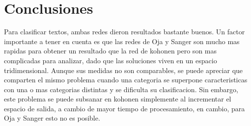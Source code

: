 \section{Conclusiones}
Para clasificar textos, ambas redes dieron resultados bastante buenos. Un factor importante a tener en cuenta es que las redes de Oja y Sanger son mucho mas rapidas para obtener un resultado que la red de kohonen pero son mas complicadas para analizar, dado que las soluciones viven en un espacio tridimensional. Aunque sus medidas no son comparables, se puede apreciar que comparten el mismo problema cuando una categoria se superpone caracteristicas con una o mas categorias distintas y se dificulta su clasificacion. Sin embargo, este problema se puede subsanar en kohonen simplemente al incrementar el espacio de salida, a cambio de mayor tiempo de procesamiento, en cambio, para Oja y Sanger esto no es posible.